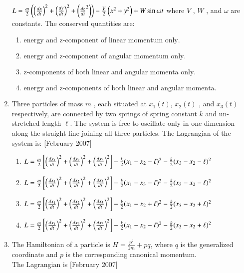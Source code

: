 \documentclass[journal]{IEEEtran}
\begin{document}
\begin{enumerate}
$L = \frac{m}{2} \left( \left( \frac{dx}{dt} \right)^2 + \left( \frac{dy}{dt} \right)^2 + \left( \frac{dz}{dt}^2 \right) \right) - \frac{V}{2} \left( x^2 + y^2 \right) + W \sin \omega t $
where  $V$ ,  $W$ , and  $\omega$  are constants. The conserved quantities are:
\begin{enumerate}
\item $\text{energy and z-component of linear momentum only.}$
\item $ \text{energy and z-component of angular momentum only.} $
\item $\text{z-components of both linear and angular momenta only.} $
\item $ \text{energy and z-components of both linear and angular momenta.}$
\end{enumerate} 
\item Three particles of mass  $m$ , each situated at $ x_1(t) $,  $x_2(t)$ , and $ x_3(t)$  respectively, are connected by two springs of spring constant  $k$ and un-stretched length $ \ell $. The system is free to oscillate only in one dimension along the straight line joining all three particles. The Lagrangian of the system is: \hfill[February 2007]
\begin{enumerate}
\item $  L = \frac{m}{2} {}\left[ \left(\frac{dx_1}{dt}\right)^2 + \left( \frac{dx_2}{dt} \right)^2 + \left( \frac{dx_3}{dt} \right)^2\right] - \frac{k}{2} (x_1 - x_2 - \ell)^2 - \frac{k}{2} (x_3 - x_2 - \ell)^2$
\item $  L = \frac{m}{2} {}\left[ \left(\frac{dx_1}{dt}\right)^2 + \left( \frac{dx_2}{dt} \right)^2 + \left( \frac{dx_3}{dt} \right)^2\right] - \frac{k}{2} (x_1 - x_3 - \ell)^2 - \frac{k}{2} (x_3 - x_2 - \ell)^2$
\item  $  L = \frac{m}{2} {}\left[ \left(\frac{dx_1}{dt}\right)^2 + \left( \frac{dx_2}{dt} \right)^2 + \left( \frac{dx_3}{dt} \right)^2\right] - \frac{k}{2} (x_1 - x_2 + \ell)^2 - \frac{k}{2} (x_3 - x_2 + \ell)^2$
\item $  L = \frac{m}{2} {}\left[ \left(\frac{dx_1}{dt}\right)^2 + \left( \frac{dx_2}{dt} \right)^2 + \left( \frac{dx_3}{dt} \right)^2\right]  - \frac{k}{2} (x_1 - x_2 - \ell)^2 - \frac{k}{2} (x_3 - x_2 + \ell)^2$
\end{enumerate}
\item The Hamiltonian of a particle is $ H = \frac{p^2}{2m} + pq $, where  $q$ is the generalized coordinate and  $p$  is the corresponding canonical momentum.\\ The Lagrangian is \hfill[February 2007]


\end{enumerate}
\end{document}
